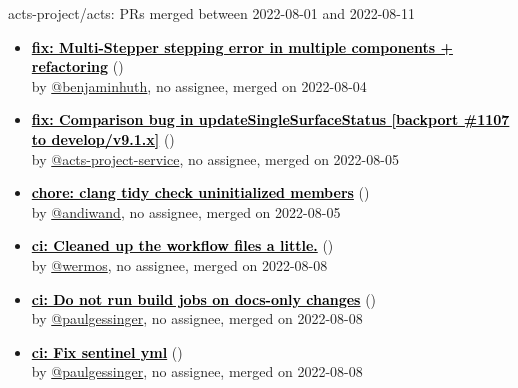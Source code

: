 \begin{frame}[allowframebreaks]{ acts-project/acts: PRs merged 
between 2022-08-01 and 2022-08-11
}
\begin{itemize}
    \item\prmerged\textbf{\href{https://github.com/acts-project/acts/pull/1339}{\textcolor{black}{fix: Multi-Stepper stepping error in multiple components + refactoring}}}
    (\href{https://github.com/acts-project/acts/pull/1339}{}) \\
    by \href{https://github.com/benjaminhuth}{@benjaminhuth}, {}no assignee, merged on 2022-08-04

    \item\prmerged\textbf{\href{https://github.com/acts-project/acts/pull/1380}{\textcolor{black}{fix: Comparison bug in updateSingleSurfaceStatus [backport \#1107 to develop/v9.1.x]}}}
    (\href{https://github.com/acts-project/acts/pull/1380}{}) \\
    by \href{https://github.com/acts-project-service}{@acts-project-service}, {}no assignee, merged on 2022-08-05

    \item\prmerged\textbf{\href{https://github.com/acts-project/acts/pull/1373}{\textcolor{black}{chore: clang tidy check uninitialized members}}}
    (\href{https://github.com/acts-project/acts/pull/1373}{}) \\
    by \href{https://github.com/andiwand}{@andiwand}, {}no assignee, merged on 2022-08-05

    \item\prmerged\textbf{\href{https://github.com/acts-project/acts/pull/1384}{\textcolor{black}{ci: Cleaned up the workflow files a little.}}}
    (\href{https://github.com/acts-project/acts/pull/1384}{}) \\
    by \href{https://github.com/wermos}{@wermos}, {}no assignee, merged on 2022-08-08

    \item\prmerged\textbf{\href{https://github.com/acts-project/acts/pull/1388}{\textcolor{black}{ci: Do not run build jobs on docs-only changes}}}
    (\href{https://github.com/acts-project/acts/pull/1388}{}) \\
    by \href{https://github.com/paulgessinger}{@paulgessinger}, {}no assignee, merged on 2022-08-08

    \item\prmerged\textbf{\href{https://github.com/acts-project/acts/pull/1389}{\textcolor{black}{ci: Fix sentinel yml}}}
    (\href{https://github.com/acts-project/acts/pull/1389}{}) \\
    by \href{https://github.com/paulgessinger}{@paulgessinger}, {}no assignee, merged on 2022-08-08


\end{itemize}
\end{frame}

